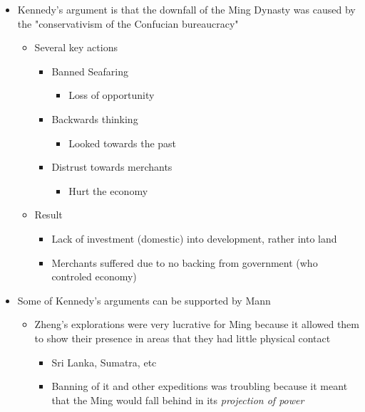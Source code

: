\documentclass[letterpaper]{article}
\begin{document}
\begin{itemize}
\item Kennedy's argument is that the downfall of the Ming Dynasty was caused
by the "conservativism of the Confucian bureaucracy"

\begin{itemize}
\item Several key actions

\begin{itemize}
\item Banned Seafaring

\begin{itemize}
\item Loss of opportunity
\end{itemize}

\item Backwards thinking

\begin{itemize}
\item Looked towards the past
\end{itemize}

\item Distrust towards merchants

\begin{itemize}
\item Hurt the economy
\end{itemize}
\end{itemize}

\item Result

\begin{itemize}
\item Lack of investment (domestic) into development, rather into land
\item Merchants suffered due to no backing from government (who
controled economy)
\end{itemize}
\end{itemize}

\item Some of Kennedy's arguments can be supported by Mann

\begin{itemize}
\item Zheng's explorations were very lucrative for Ming because it allowed
them to show their presence in areas that they had little physical
contact

\begin{itemize}
\item Sri Lanka, Sumatra, etc
\item Banning of it and other expeditions was troubling because it meant
that the Ming would fall behind in its \emph{projection of power}
\end{itemize}


\end{itemize}
\end{itemize}
\end{document}
